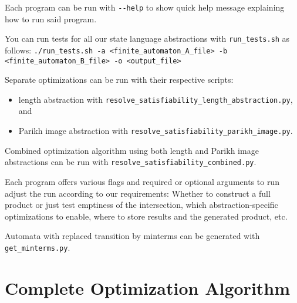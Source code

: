 Each program can be run with \texttt{-\--help} to show quick help message explaining how to run said program.

You can run tests for all our state language abstractions with \texttt{run\_tests.sh} as follows:
{
    \centering \footnotesize \texttt{./run\_tests.sh -a <finite\_automaton\_A\_file> -b <finite\_automaton\_B\_file> -o <output\_file>}
}

Separate optimizations can be run with their respective scripts:
\begin{itemize}
    \item length abstraction with \texttt{resolve\_satisfiability\_length\_abstraction.py}, and
    \item Parikh image abstraction with \texttt{resolve\_satisfiability\_parikh\_image.py}.
\end{itemize}
Combined optimization algorithm using both length and Parikh image abstractions can be run with \texttt{resolve\_satisfiability\_combined.py}.

Each program offers various flags and required or optional arguments to run adjust the run according to our requirements: Whether to construct a full product or just test emptiness of the intersection, which abstraction-specific optimizations to enable, where to store results and the generated product, etc.

Automata with replaced transition by minterms can be generated with \texttt{get\_minterms.py}.




\chapter{Complete Optimization Algorithm}

